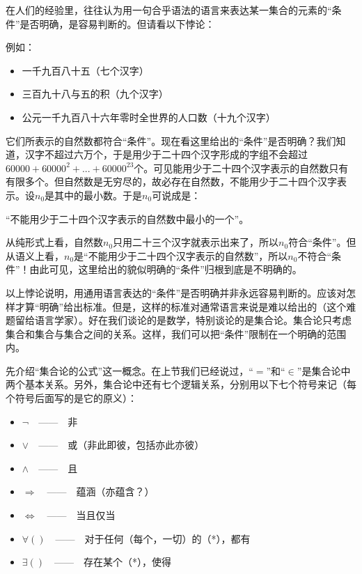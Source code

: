 在人们的经验里，往往认为用一句合乎语法的语言来表达某一集合的元素的“条件”是否明确，是容易判断的。但请看以下悖论：


例如：
\begin{itemize}[label=$\circ$]
\item 一千九百八十五（七个汉字）
\item 三百九十八与五的积（九个汉字）
\item 公元一千九百八十六年零时全世界的人口数（十九个汉字）
\end{itemize}

\noindent 它们所表示的自然数都符合“条件”。现在看这里给出的“条件”是否明确？我们知道，汉字不超过六万个，于是用少于二十四个汉字形成的字组不会超过$60000+60000^{2} +...+60000^{23}$个。可见能用少于二十四个汉字表示的自然数只有有限多个。但自然数是无穷尽的，故必存在自然数，不能用少于二十四个汉字表示。设$n_{0}$是其中的最小数。于是$n_{0}$可说成是：
\begin{center}
“不能用少于二十四个汉字表示的自然数中最小的一个”。
\end{center}
\noindent 从纯形式上看，自然数$n_{0}$只用二十三个汉字就表示出来了，所以$n_{0}$符合“条件”。但从语义上看，$n_{0}$是“不能用少于二十四个汉字表示的自然数”，所以$n_{0}$不符合“条件”！由此可见，这里给出的貌似明确的“条件”归根到底是不明确的。

以上悖论说明，用通用语言表达的“条件”是否明确并非永远容易判断的。应该对怎样才算“明确”给出标准。但是，这样的标准对通常语言来说是难以给出的（这个难题留给语言学家）。好在我们谈论的是数学，特别谈论的是集合论。集合论只考虑集合和集合与集合之间的关系。这样，我们可以把“条件”限制在一个明确的范围内。

先介绍“集合论的公式”这一概念。在上节我们已经说过，“$=$”和“$\in$”是集合论中两个基本关系。另外，集合论中还有七个逻辑关系，分别用以下七个符号来记（每个符号后面写的是它的原义）：
\begin{itemize}[label=$\circ$]
\item $\neg$$\quad$——$\quad$非
\item $\lor$$\quad$——$\quad$或（非此即彼，包括亦此亦彼）
\item $\land$$\quad$——$\quad$且
\item $\Rightarrow$$\quad$——$\quad$蕴涵（亦蕴含？）
\item $\Leftrightarrow$$\quad$——$\quad$当且仅当
\item $\forall()$$\quad$——$\quad$对于任何（每个，一切）的（*），都有
\item $\exists()$$\quad$——$\quad$存在某个（*），使得
\end{itemize}

